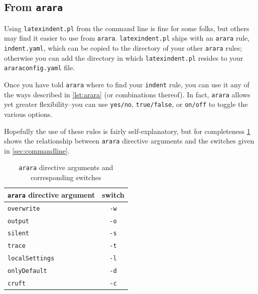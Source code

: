 \documentclass[11pt]{article}
\begin{document}
\subsection{From \lstinline!arara!}
Using \lstinline!latexindent.pl! from the command line is fine for some folks, but
others may find it easier to use from \lstinline!arara!. \lstinline!latexindent.pl!
ships with an \lstinline!arara! rule, \lstinline!indent.yaml!, which can be copied
to the directory of
your other \lstinline!arara! rules; otherwise  you can add the directory in which \lstinline!latexindent.pl!
resides to your \lstinline!araraconfig.yaml! file.

Once you have told \lstinline!arara! where to find your \lstinline!indent! rule,
you can use it any of the ways described in \cref{lst:arara} (or combinations thereof).
In fact, \lstinline!arara! allows yet greater flexibility--you can use \lstinline!yes/no!, \lstinline!true/false!, or \lstinline!on/off! to toggle the various options.


Hopefully the use of these rules is fairly self-explanatory, but for completeness
\cref{tab:orbsandswitches} shows the relationship between \lstinline!arara! directive arguments and the
switches given in \cref{sec:commandline}.

\begin{table}[!ht]
	\centering
	\caption{\lstinline!arara! directive arguments and corresponding switches}
	\label{tab:orbsandswitches}
	\begin{tabular}{lc}
		\toprule
		\lstinline!arara! directive argument & switch         \\
		\midrule
		\lstinline!overwrite!                & \lstinline!-w! \\
		\lstinline!output!                   & \lstinline!-o! \\
		\lstinline!silent!                   & \lstinline!-s! \\
		\lstinline!trace!                    & \lstinline!-t! \\
		\lstinline!localSettings!            & \lstinline!-l! \\
		\lstinline!onlyDefault!              & \lstinline!-d! \\
		\lstinline!cruft!                    & \lstinline!-c! \\
		\bottomrule
	\end{tabular}
\end{table}
\end{document}
